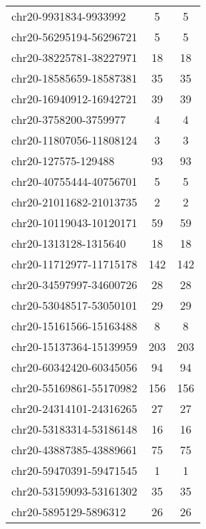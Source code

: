 \begin{longtable}{lSS}
	chr20-9931834-9933992   & 5      & 5                          \\
	chr20-56295194-56296721 & 5      & 5                          \\
	chr20-38225781-38227971 & 18     & 18                         \\
	chr20-18585659-18587381 & 35     & 35                         \\
	chr20-16940912-16942721 & 39     & 39                         \\
	chr20-3758200-3759977   & 4      & 4                          \\
	chr20-11807056-11808124 & 3      & 3                          \\
	chr20-127575-129488     & 93     & 93                         \\
	chr20-40755444-40756701 & 5      & 5                          \\
	chr20-21011682-21013735 & 2      & 2                          \\
	chr20-10119043-10120171 & 59     & 59                         \\
	chr20-1313128-1315640   & 18     & 18                         \\
	chr20-11712977-11715178 & 142    & 142                        \\
	chr20-34597997-34600726 & 28     & 28                         \\
	chr20-53048517-53050101 & 29     & 29                         \\
	chr20-15161566-15163488 & 8      & 8                          \\
	chr20-15137364-15139959 & 203    & 203                        \\
	chr20-60342420-60345056 & 94     & 94                         \\
	chr20-55169861-55170982 & 156    & 156                        \\
	chr20-24314101-24316265 & 27     & 27                         \\
	chr20-53183314-53186148 & 16     & 16                         \\
	chr20-43887385-43889661 & 75     & 75                         \\
	chr20-59470391-59471545 & 1      & 1                          \\
	chr20-53159093-53161302 & 35     & 35                         \\
	chr20-5895129-5896312   & 26     & 26                         \\

\end{longtable}

